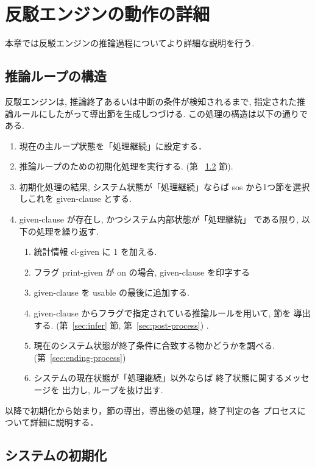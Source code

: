 \chapter{反駁エンジンの動作の詳細}
\label{sec:process-in-detail}

本章では反駁エンジンの推論過程についてより詳細な説明を行う.

\section{推論ループの構造}
反駁エンジンは, 推論終了あるいは中断の条件が検知されるまで, 
指定された推論ルールにしたがって導出節を生成しつづける. 
この処理の構造は以下の通りである.

\begin{enumerate}
\item 現在の主ループ状態を「処理継続」に設定する．

\item 推論ループのための初期化処理を実行する.
  (第 ~\ref{sec:system-init} 節).

\item 初期化処理の結果, システム状態が「処理継続」ならば
  sos から1つ節を選択しこれを given-clause とする.

\item given-clause が存在し, かつシステム内部状態が「処理継続」
  である限り, 以下の処理を繰り返す.
  \begin{enumerate}
  \item 統計情報 cl-given に 1 を加える.
  \item フラグ print-given が on の場合, given-clause を印字する
  \item given-clause を usable の最後に追加する.
  \item given-clause からフラグで指定されている推論ルールを用いて, 節を
    導出する. 
    (第~\ref{sec:infer} 節, 第~\ref{sec:post-process}) . 
  \item 現在のシステム状態が終了条件に合致する物かどうかを調べる.
    (第~\ref{sec:ending-process})
  \item システムの現在状態が「処理継続」以外ならば
    終了状態に関するメッセージを
    出力し, ループを抜け出す.
  \end{enumerate}
\end{enumerate}

以降で初期化から始まり，節の導出，導出後の処理，終了判定の各
プロセスについて詳細に説明する．

\section{システムの初期化}
\label{sec:system-init}

